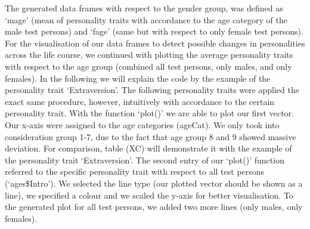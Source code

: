 \newline \newline
The generated data frames with respect to the gender group, was defined as `mage' (mean of personality traits with accordance to the age category of the male test persons) and `fage' (same but with respect to only female test persons).
\newline \newline
For the visualisation of our data frames to detect possible changes in personalities across the life course, we continued with plotting the average personality traits with respect to the age group (combined all test persons, only males, and only females).
\newline \newline
In the following we will explain the code by the example of the personality trait `Extraversion'. The following personality traits were applied the exact same procedure, however, intuitively with accordance to the certain personality trait.
\newline \newline
With the function `plot()' we are able to plot our first vector. Our x-axis were assigned to the age categories (ageCat). We only took into consideration group 1-7, due to the fact that age group 8 and 9 showed massive deviation. For comparison, table (XC) will demonstrate it with the example of the personality trait `Extraversion'. The second entry of our `plot()' function referred to the specific personality trait with respect to all test persons (`ages\$Intro'). We selected the line type (our plotted vector should be shown as a line), we specified a colour and we scaled the y-axis for better visualisation. 
\newline \newline
To the generated plot for all test persons, we added two more lines (only males, only females). 
\newline \newline

